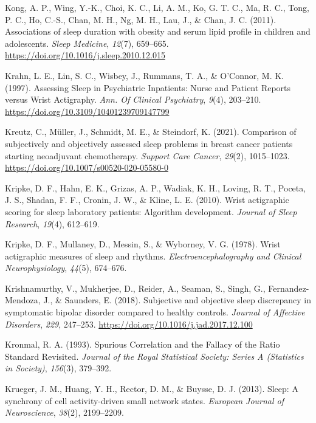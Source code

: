 \documentclass[
]{article}
\newlength{\cslhangindent}
\newenvironment{CSLReferences}[2] %
 {\begin{list}{}{%
  \setlength{\itemindent}{0pt}
  \setlength{\leftmargin}{0pt}
  \setlength{\parsep}{0pt}
  \ifodd #1
   \setlength{\leftmargin}{\cslhangindent}
   \setlength{\itemindent}{-1\cslhangindent}
  \fi
  \setlength{\itemsep}{#2\baselineskip}}}
 {\end{list}}
\begin{document}
\begin{CSLReferences}{1}{0}
Kong, A. P., Wing, Y.-K., Choi, K. C., Li, A. M., Ko, G. T. C., Ma, R. C., Tong, P. C., Ho, C.-S., Chan, M. H., Ng, M. H., Lau, J., \& Chan, J. C. (2011). Associations of sleep duration with obesity and serum lipid profile in children and adolescents. \emph{Sleep Medicine}, \emph{12}(7), 659--665. \url{https://doi.org/10.1016/j.sleep.2010.12.015}

Krahn, L. E., Lin, S. C., Wisbey, J., Rummans, T. A., \& O'Connor, M. K. (1997). Assessing {Sleep} in {Psychiatric} {Inpatients}: {Nurse} and {Patient} {Reports} versus {Wrist} {Actigraphy}. \emph{Ann. Of Clinical Psychiatry}, \emph{9}(4), 203--210. \url{https://doi.org/10.3109/10401239709147799}

Kreutz, C., Müller, J., Schmidt, M. E., \& Steindorf, K. (2021). Comparison of subjectively and objectively assessed sleep problems in breast cancer patients starting neoadjuvant chemotherapy. \emph{Support Care Cancer}, \emph{29}(2), 1015--1023. \url{https://doi.org/10.1007/s00520-020-05580-0}

Kripke, D. F., Hahn, E. K., Grizas, A. P., Wadiak, K. H., Loving, R. T., Poceta, J. S., Shadan, F. F., Cronin, J. W., \& Kline, L. E. (2010). Wrist actigraphic scoring for sleep laboratory patients: Algorithm development. \emph{Journal of Sleep Research}, \emph{19}(4), 612--619.

Kripke, D. F., Mullaney, D., Messin, S., \& Wyborney, V. G. (1978). Wrist actigraphic measures of sleep and rhythms. \emph{Electroencephalography and Clinical Neurophysiology}, \emph{44}(5), 674--676.

Krishnamurthy, V., Mukherjee, D., Reider, A., Seaman, S., Singh, G., Fernandez-Mendoza, J., \& Saunders, E. (2018). Subjective and objective sleep discrepancy in symptomatic bipolar disorder compared to healthy controls. \emph{Journal of Affective Disorders}, \emph{229}, 247--253. \url{https://doi.org/10.1016/j.jad.2017.12.100}

Kronmal, R. A. (1993). {Spurious Correlation and the Fallacy of the Ratio Standard Revisited}. \emph{Journal of the Royal Statistical Society: Series A (Statistics in Society)}, \emph{156}(3), 379--392.

Krueger, J. M., Huang, Y. H., Rector, D. M., \& Buysse, D. J. (2013). Sleep: A synchrony of cell activity-driven small network states. \emph{European Journal of Neuroscience}, \emph{38}(2), 2199--2209.


\end{CSLReferences}
\end{document}
